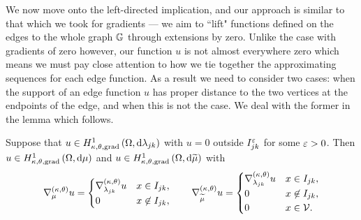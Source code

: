 We now move onto the left-directed implication, and our approach is similar to that which we took for gradients --- we aim to ``lift" functions defined on the edges to the whole graph $\mathbb{G}$ through extensions by zero.
Unlike the case with gradients of zero however, our function $u$ is not almost everywhere zero which means we must pay close attention to how we tie together the approximating sequences for each edge function.
As a result we need to consider two cases: when the support of an edge function $u$ has proper distance to the two vertices at the endpoints of the edge, and when this is not the case.
We deal with the former in the lemma which follows.
\begin{lemma} \label{lem:ExtensionLemmaEdgeFunctions}
	Suppose that $u\in H^1_{\kappa,\theta,\mathrm{grad}}\left( \Omega, \mathrm{d}\lambda_{jk} \right)$ with $u=0$ outside $I_{jk}^\varepsilon$ for some $\varepsilon>0$.
	Then $u\in H^1_{\kappa,\theta,\mathrm{grad}}\left( \Omega, \mathrm{d}\mu \right)$ and $u\in H^1_{\kappa,\theta,\mathrm{grad}}\left( \Omega, \mathrm{d}\widetilde{\mu} \right)$ with
	\begin{align*}
		\nabla^{\left( \kappa, \theta \right)}_{\mu}u = 
		\begin{cases} 
			\nabla^{\left( \kappa, \theta \right)}_{\lambda_{jk}}u & x\in I_{jk}, \\
			0 & x\not\in I_{jk}, 
		\end{cases}
		\qquad
		\nabla^{\left( \kappa, \theta \right)}_{\widetilde{\mu}}u = 
		\begin{cases} 
			\nabla^{\left( \kappa, \theta \right)}_{\lambda_{jk}}u & x\in I_{jk}, \\
			0 & x\not\in I_{jk}, \\
			0 & x\in\mathcal{V}.
		\end{cases}
	\end{align*}
\end{lemma}
